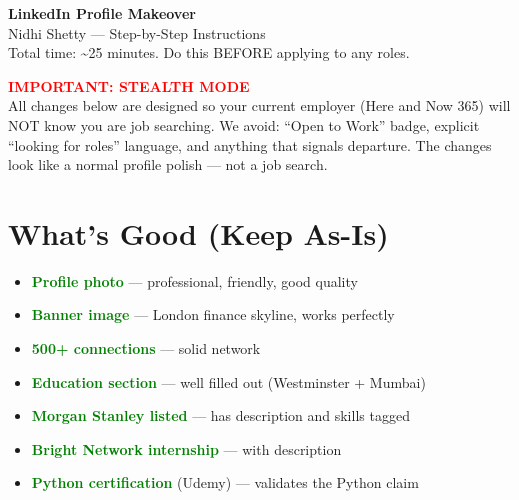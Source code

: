 \documentclass[11pt,a4paper]{article}
\begin{document}
{\LARGE\bfseries\color{primary} LinkedIn Profile Makeover}\\[4pt]
{\large Nidhi Shetty --- Step-by-Step Instructions}\\[4pt]
{\small Total time: \textasciitilde25 minutes. Do this BEFORE applying to any roles.}

\vspace{6pt}
\begin{mdframed}[linecolor=red, linewidth=1pt, innerleftmargin=10pt, innerrightmargin=10pt, innertopmargin=8pt, innerbottommargin=8pt]
\textcolor{red}{\bfseries IMPORTANT: STEALTH MODE}\\[2pt]
All changes below are designed so your current employer (Here and Now 365) will NOT know you are job searching. We avoid: ``Open to Work'' badge, explicit ``looking for roles'' language, and anything that signals departure. The changes look like a normal profile polish --- not a job search.
\end{mdframed}

\vspace{8pt}

\section{What's Good (Keep As-Is)}

\begin{itemize}[leftmargin=1.2em]
    \item \textcolor{green}{\bfseries Profile photo} --- professional, friendly, good quality
    \item \textcolor{green}{\bfseries Banner image} --- London finance skyline, works perfectly
    \item \textcolor{green}{\bfseries 500+ connections} --- solid network
    \item \textcolor{green}{\bfseries Education section} --- well filled out (Westminster + Mumbai)
    \item \textcolor{green}{\bfseries Morgan Stanley listed} --- has description and skills tagged
    \item \textcolor{green}{\bfseries Bright Network internship} --- with description
    \item \textcolor{green}{\bfseries Python certification} (Udemy) --- validates the Python claim
\end{itemize}

\end{document}
